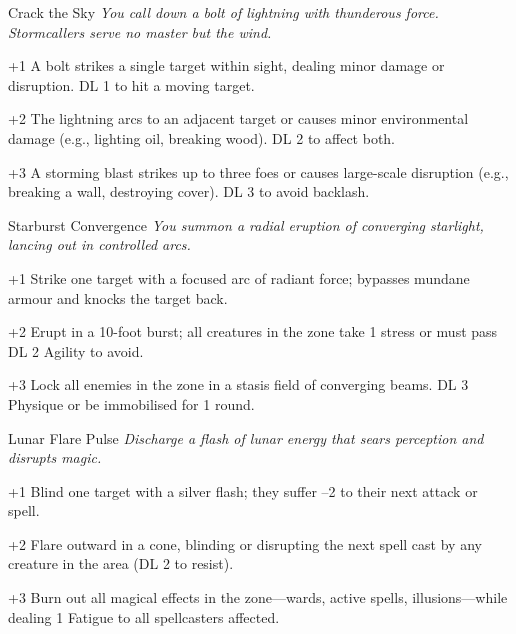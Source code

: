 \begin{WyrdSpell}[Stormcalling]{Crack the Sky}
\textit{You call down a bolt of lightning with thunderous force. Stormcallers serve no master but the wind.}
    \begin{WyrdSpellBlock}
        \item[+1] A bolt strikes a single target within sight, dealing minor damage or disruption. DL 1 to hit a moving target.
        \item[+2] The lightning arcs to an adjacent target or causes minor environmental damage (e.g., lighting oil, breaking wood). DL 2 to affect both.
        \item[+3] A storming blast strikes up to three foes or causes large-scale disruption (e.g., breaking a wall, destroying cover). DL 3 to avoid backlash.
    \end{WyrdSpellBlock}
\end{WyrdSpell}

\begin{WyrdSpell}[Astral]{Starburst Convergence}\label{spell:starburst-convergence}
    \textit{You summon a radial eruption of converging starlight, lancing out in controlled arcs.}
    
    \begin{WyrdSpellBlock}
        \item[+1] Strike one target with a focused arc of radiant force; bypasses mundane armour and knocks the target back.
        
        \item[+2] Erupt in a 10-foot burst; all creatures in the zone take 1 stress or must pass DL 2 Agility to avoid.
        
        \item[+3] Lock all enemies in the zone in a stasis field of converging beams. DL 3 Physique or be immobilised for 1 round.
    \end{WyrdSpellBlock}
\end{WyrdSpell}

\begin{WyrdSpell}[Elemental]{Lunar Flare Pulse}\label{spell:lunar-flare-pulse}
    \textit{Discharge a flash of lunar energy that sears perception and disrupts magic.}
    
    \begin{WyrdSpellBlock}
        \item[+1] Blind one target with a silver flash; they suffer –2 to their next attack or spell.
        
        \item[+2] Flare outward in a cone, blinding or disrupting the next spell cast by any creature in the area (DL 2 to resist).
        
        \item[+3] Burn out all magical effects in the zone—wards, active spells, illusions—while dealing 1 Fatigue to all spellcasters affected.
    \end{WyrdSpellBlock}
\end{WyrdSpell}

